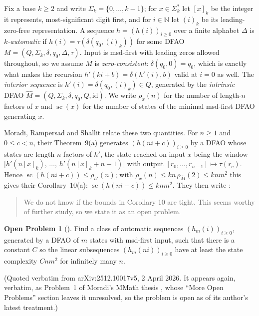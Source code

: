 \documentclass[10pt,reqno]{amsart}
\theoremstyle{plain}
\theoremstyle{definition}
\newtheorem{problem}{Open Problem}
\theoremstyle{remark}
\numberwithin{theorem}{section}
\DeclareMathOperator{\sco}{sc}
\newcommand{\N}{\mathbb{N}}
\newcommand{\Sig}{\Sigma_k}
\begin{document}
Fix a base $k \ge 2$ and write $\Sig = \{0,\dots,k-1\}$; for $x \in \Sig^*$ let $[x]_k$ be
the integer it represents, most-significant digit first, and for $i \in \N$ let $(i)_k$ be
its leading-zero-free representation. A sequence $h = (h(i))_{i \ge 0}$ over a finite
alphabet $\Delta$ is \emph{$k$-automatic} if $h(i) = \tau(\delta(q_0,(i)_k))$ for some DFAO
$M = (Q,\Sig,\delta,q_0,\Delta,\tau)$. Input is msd-first with leading zeros allowed
throughout, so we assume $M$ is \emph{zero-consistent}: $\delta(q_0,0) = q_0$, which is
exactly what makes the recursion $h'(ki+b) = \delta(h'(i),b)$ valid at $i = 0$ as well. The
\emph{interior sequence} is $h'(i) = \delta(q_0,(i)_k) \in Q$, generated by the
\emph{intrinsic} DFAO $\widehat{M} = (Q,\Sig,\delta,q_0,Q,\mathrm{id})$. We write
$\rho_x(n)$ for the number of length-$n$ factors of $x$ and $\sco(x)$ for the number of
states of the minimal msd-first DFAO generating $x$.

Moradi, Rampersad and Shallit \cite{MRS} relate these two quantities. For $n \ge 1$ and
$0 \le c < n$, their Theorem~9(a) generates $(h(ni+c))_{i \ge 0}$ by a DFAO whose states are
length-$n$ factors of $h'$, the state reached on input $x$ being the window
$\bigl[h'(n[x]_k),\, \dots,\, h'(n[x]_k+n-1)\bigr]$ with output
$[r_0,\dots,r_{n-1}] \mapsto \tau(r_c)$. Hence $\sco(h(ni+c)) \le \rho_{h'}(n)$; with
$\rho_x(n) \le kn\,\rho_{\widehat M}(2) \le knm^2$ \cite[Thm.~10.3.1]{AS} this gives their
Corollary~10(a): $\sco(h(ni+c)) \le knm^2$. They then write \cite[\S4]{MRS}:

\begin{quote}
We do not know if the bounds in Corollary 10 are tight. This seems worthy of further
study, so we state it as an open problem.
\end{quote}

\begin{problem}[{\cite[\S4]{MRS}}]
\label{op1}
Find a class of automatic sequences $(h_m(i))_{i\ge0}$, generated by a DFAO of $m$ states
with msd-first input, such that there is a constant $C$ so the linear subsequences
$(h_m(ni))_{i\ge0}$ have at least the state complexity $Cnm^2$ for infinitely many $n$.
\end{problem}

(Quoted verbatim from arXiv:2512.10017v5, 2 April 2026. It appears again, verbatim, as
Problem~1 of Moradi's MMath thesis \cite{Moradi-thesis}, whose ``More Open Problems''
section leaves it unresolved, so the problem is open as of its author's latest treatment.)
\end{document}
